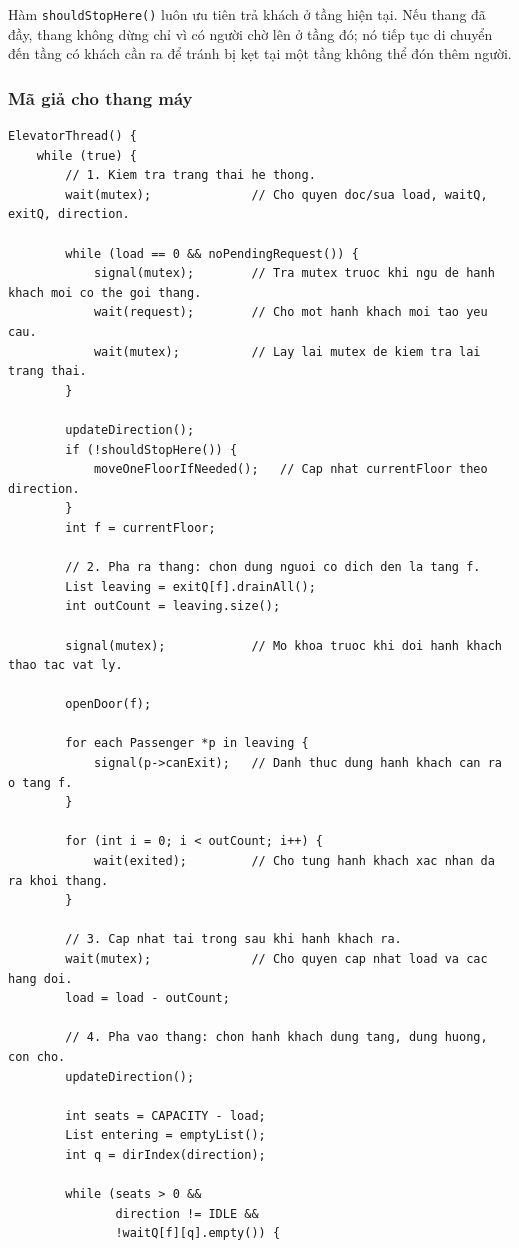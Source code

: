 Hàm \texttt{shouldStopHere()} luôn ưu tiên trả khách ở tầng hiện tại. Nếu
thang đã đầy, thang không dừng chỉ vì có người chờ lên ở tầng đó; nó tiếp tục
di chuyển đến tầng có khách cần ra để tránh bị kẹt tại một tầng không thể đón
thêm người.

\subsubsection*{Mã giả cho thang máy}

\begin{lstlisting}
ElevatorThread() {
    while (true) {
        // 1. Kiem tra trang thai he thong.
        wait(mutex);              // Cho quyen doc/sua load, waitQ, exitQ, direction.

        while (load == 0 && noPendingRequest()) {
            signal(mutex);        // Tra mutex truoc khi ngu de hanh khach moi co the goi thang.
            wait(request);        // Cho mot hanh khach moi tao yeu cau.
            wait(mutex);          // Lay lai mutex de kiem tra lai trang thai.
        }

        updateDirection();
        if (!shouldStopHere()) {
            moveOneFloorIfNeeded();   // Cap nhat currentFloor theo direction.
        }
        int f = currentFloor;

        // 2. Pha ra thang: chon dung nguoi co dich den la tang f.
        List leaving = exitQ[f].drainAll();
        int outCount = leaving.size();

        signal(mutex);            // Mo khoa truoc khi doi hanh khach thao tac vat ly.

        openDoor(f);

        for each Passenger *p in leaving {
            signal(p->canExit);   // Danh thuc dung hanh khach can ra o tang f.
        }

        for (int i = 0; i < outCount; i++) {
            wait(exited);         // Cho tung hanh khach xac nhan da ra khoi thang.
        }

        // 3. Cap nhat tai trong sau khi hanh khach ra.
        wait(mutex);              // Cho quyen cap nhat load va cac hang doi.
        load = load - outCount;

        // 4. Pha vao thang: chon hanh khach dung tang, dung huong, con cho.
        updateDirection();

        int seats = CAPACITY - load;
        List entering = emptyList();
        int q = dirIndex(direction);

        while (seats > 0 &&
               direction != IDLE &&
               !waitQ[f][q].empty()) {


\end{lstlisting}
